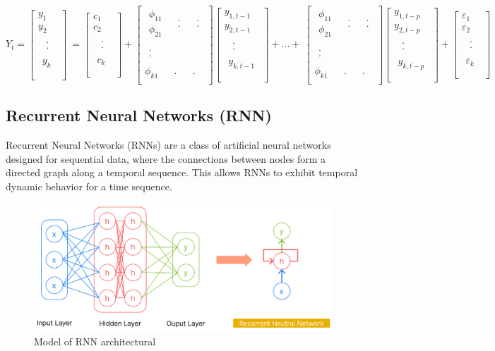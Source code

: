 \documentclass{ieeeojies}
\begin{document}
\begin{dmath*}
    Y_t=\left[\begin{matrix}y_1\\y_2\\\begin{matrix}\begin{matrix}.\\.\\\end{matrix}\\y_k\\\end{matrix}\\\end{matrix}\right]\ =\left[\begin{matrix}c_1\\c_2\\\begin{matrix}\begin{matrix}.\\.\\\end{matrix}\\c_k\\\end{matrix}\\\end{matrix}\right]+\left[\begin{matrix}\begin{matrix}\phi_{11}\\\phi_{21}\\\end{matrix}&\begin{matrix}.\\.\\\end{matrix}&\begin{matrix}.\\.\\\end{matrix}\\\begin{matrix}.\\.\\\end{matrix}&\ &\ \\\phi_{k1}&.&.\\\end{matrix}\right]\left[\begin{matrix}y_{1,t-1}\\y_{2,t-1}\\\begin{matrix}\begin{matrix}.\\.\\\end{matrix}\\y_{k,t-1}\\\end{matrix}\\\end{matrix}\right]+...+\ \left[\begin{matrix}\begin{matrix}\phi_{11}\\\phi_{21}\\\end{matrix}&\begin{matrix}.\\.\\\end{matrix}&\begin{matrix}.\\.\\\end{matrix}\\\begin{matrix}.\\.\\\end{matrix}&\ &\ \\\phi_{k1}&.&.\\\end{matrix}\right]\left[\begin{matrix}y_{1,t-p}\\y_{2,t-p}\\\begin{matrix}\begin{matrix}.\\.\\\end{matrix}\\y_{k,t-p}\\\end{matrix}\\\end{matrix}\right]+\left[\begin{matrix}\varepsilon_1\\\varepsilon_2\\\begin{matrix}\begin{matrix}.\\.\\\end{matrix}\\\varepsilon_k\\\end{matrix}\\\end{matrix}\right]
\end{dmath*}

\subsection{Recurrent Neural Networks (RNN)}
Recurrent Neural Networks (RNNs) are a class of artificial neural networks designed for sequential data, where the connections between nodes form a directed graph along a temporal sequence. This allows RNNs to exhibit temporal dynamic behavior for a time sequence.\ 
\begin{figure}[h]
    \centering
    \includegraphics[width=\linewidth]{./image/RNN.png}
    \caption{Model of RNN architectural}
    \label{fig:7}
\end{figure}\\
\begin {itemize}
    \item \textbf{Input Layer}: Networks have only one input layer.
    \item \textbf{Hidden
\end{itemize}
\end{document}
